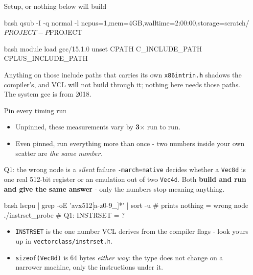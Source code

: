 \documentclass[aspectratio=169]{beamer}
\newcommand{\cplx}[1]{{\footnotesize\color{cookieMuted}#1}}
\begin{document}
\begin{frame}[fragile]{Setup, or nothing below will build}
  \begin{cookiecode}[title={get a node (why 4\,GB: Gadi charges max(cpus, mem/4GB) - 16GB costs 4x)}]{bash}
qsub -I -q normal -l ncpus=1,mem=4GB,walltime=2:00:00,storage=scratch/$PROJECT -P $PROJECT
  \end{cookiecode}
  \medskip
  \begin{cookiecode}[title={fix the environment (make refuses to build until you do)}]{bash}
module load gcc/15.1.0
unset CPATH C_INCLUDE_PATH CPLUS_INCLUDE_PATH
  \end{cookiecode}
  \medskip
  \cplx{Anything on those include paths that carries its own
  \texttt{x86intrin.h} shadows the compiler's, and VCL will not build through
  it; nothing here needs those paths. The system gcc is from 2018.}
\end{frame}

\begin{frame}[fragile]{Pin every timing run}
  \medskip
  \begin{itemize}\setlength\itemsep{4pt}
    \item Unpinned, these measurements vary by \textbf{3$\times$} run to run.
    \item Even pinned, run everything more than once - two numbers inside
      your own scatter are \emph{the same number}.
  \end{itemize}
\end{frame}

\begin{frame}[fragile]{Q1: the wrong node is a \emph{silent} failure}
  \texttt{-march=native} decides whether a \texttt{Vec8d} is one real 512-bit
  register or an emulation out of two \texttt{Vec4d}. Both \textbf{build and
  run and give the same answer} - only the numbers stop meaning anything.
  \begin{cookiecode}[title={check when you land}]{bash}
lscpu | grep -oE 'avx512[a-z0-9_]*' | sort -u   # prints nothing = wrong node
./instrset_probe                                # Q1: INSTRSET = ?
  \end{cookiecode}
  \pause
  \begin{itemize}\setlength\itemsep{4pt}
    \item \texttt{INSTRSET} is the one number VCL derives from the compiler
      flags - look yours up in \texttt{vectorclass/instrset.h}.
    \item \texttt{sizeof(Vec8d)} is 64 bytes \emph{either way}: the type does
      not change on a narrower machine, only the instructions under it.
  \end{itemize}
\end{frame}
\end{document}
